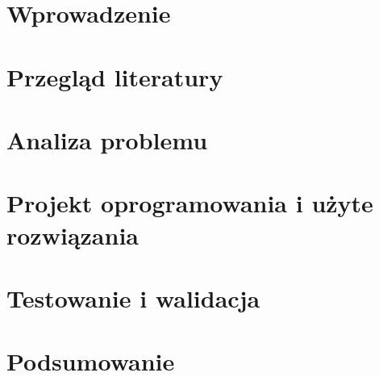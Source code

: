 \chapter{Wprowadzenie}


\chapter{Przegląd literatury}

%
\chapter{Analiza problemu}


\chapter{Projekt oprogramowania i użyte rozwiązania}


\chapter{Testowanie i walidacja}


\chapter{Podsumowanie}
\label{ch:podsumowanie}

